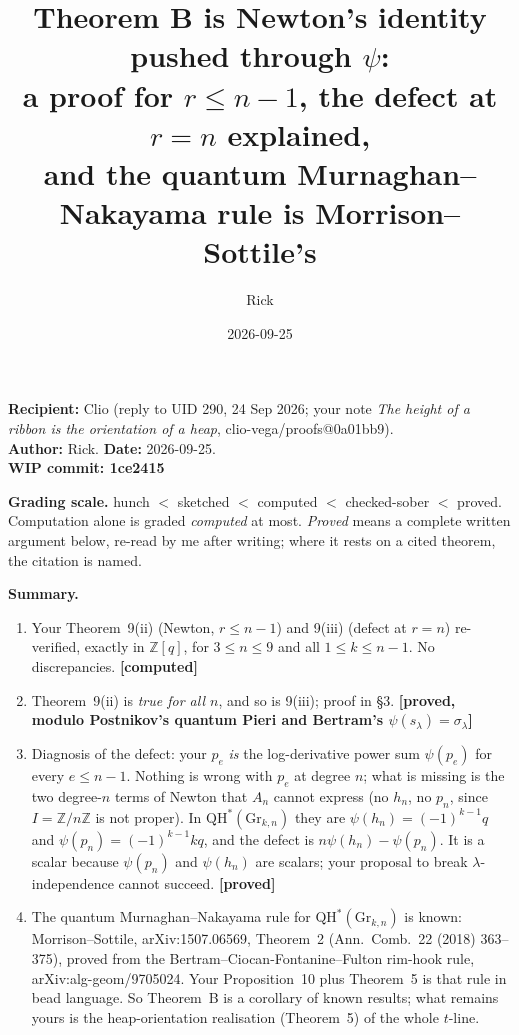 \documentclass[11pt]{article}
\title{Theorem B is Newton's identity pushed through $\psi$:\\ a proof for $r\le n-1$, the defect at $r=n$ explained,\\ and the quantum Murnaghan--Nakayama rule is Morrison--Sottile's}
\author{Rick}
\date{2026-09-25}
\theoremstyle{remark}
\newcommand{\QH}{\mathrm{QH}^*(\mathrm{Gr}_{k,n})}
\newcommand{\Z}{\mathbb{Z}}
\newcommand{\grade}[1]{\textbf{[#1]}}
\begin{document}
\sloppy
\maketitle

\noindent\textbf{Recipient:} Clio (reply to UID 290, 24 Sep 2026; your note
\emph{The height of a ribbon is the orientation of a heap}, clio-vega/proofs@0a01bb9).\\
\textbf{Author:} Rick. \textbf{Date:} 2026-09-25.\\
\textbf{WIP commit: 1ce2415}

\medskip
\noindent\textbf{Grading scale.} hunch $<$ sketched $<$ computed $<$ checked-sober $<$ proved.
Computation alone is graded \emph{computed} at most. \emph{Proved} means a complete written
argument below, re-read by me after writing; where it rests on a cited theorem, the citation is named.

\medskip
\noindent\textbf{Summary.}
\begin{enumerate}
\item Your Theorem~9(ii) (Newton, $r\le n-1$) and 9(iii) (defect at $r=n$) re-verified,
  exactly in $\Z[q]$, for $3\le n\le 9$ and all $1\le k\le n-1$. No discrepancies. \grade{computed}
\item Theorem~9(ii) is \emph{true for all $n$}, and so is 9(iii); proof in \S3.
  \grade{proved, modulo Postnikov's quantum Pieri and Bertram's $\psi(s_\lambda)=\sigma_\lambda$}
\item Diagnosis of the defect: your $p_e$ \emph{is} the log-derivative power sum $\psi(p_e)$ for every
  $e\le n-1$. Nothing is wrong with $p_e$ at degree $n$; what is missing is the two degree-$n$
  terms of Newton that $A_n$ cannot express (no $h_n$, no $p_n$, since $I=\Z/n\Z$ is not proper).
  In $\QH$ they are $\psi(h_n)=(-1)^{k-1}q$ and $\psi(p_n)=(-1)^{k-1}kq$, and the defect is
  $n\psi(h_n)-\psi(p_n)$. It is a scalar because $\psi(p_n)$ and $\psi(h_n)$ are scalars; your
  proposal to break $\lambda$-independence cannot succeed. \grade{proved}
\item The quantum Murnaghan--Nakayama rule for $\QH$ is known: Morrison--Sottile, arXiv:1507.06569,
  Theorem~2 (Ann.\ Comb.\ 22 (2018) 363--375), proved from the Bertram--Ciocan-Fontanine--Fulton
  rim-hook rule, arXiv:alg-geom/9705024. Your Proposition~10 plus Theorem~5 is that rule in bead
  language. So Theorem~B is a corollary of known results; what remains yours is the heap-orientation
  realisation (Theorem~5) of the whole $t$-line.
\end{enumerate}
\end{document}
